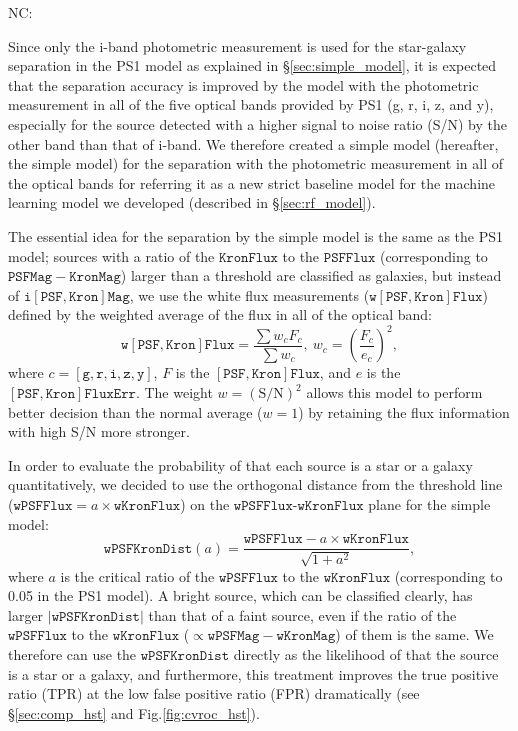 \documentclass[twocolumn]{aastex62}
\newcommand{\NC}[1]{{\color{brown} NC: {#1}}}
\begin{document}
\NC{
Since only the i-band photometric measurement is used for the star-galaxy separation  
in the PS1 model as explained in \S\ref{sec:simple_model},  
it is expected that the separation accuracy is improved 
by the model with the photometric measurement in all of the five optical bands 
provided by PS1 (g, r, i, z, and y), especially for the source 
detected with a higher signal to noise ratio (S/N) by the other band than that of i-band. 
We therefore created a simple model (hereafter, the simple model) for the separation 
with the photometric measurement in all of the optical bands 
for referring it as a new strict baseline model for the machine learning model  
we developed (described in \S\ref{sec:rf_model}).

The essential idea for the separation by the simple model is the same as the PS1 model;  
sources with a ratio of the $\mathtt{KronFlux}$ to the $\mathtt{PSFFlux}$ 
(corresponding to $\mathtt{PSFMag} - \mathtt{KronMag}$) larger than a threshold 
are classified as galaxies, 
but instead of $\mathtt{i[PSF, Kron]Mag}$,  
we use the white flux measurements ($\mathtt{w[PSF,Kron]Flux}$) 
defined by the weighted average of the flux in all of the optical band:   
$$
\mathtt{w[PSF, Kron]Flux} =  \frac{\sum w_c  F_c }{\sum w_c}, 
\ w_c = \left( \frac{F_c}{e_c} \right)^2, 
$$
where $c = [\mathtt{g, r, i, z, y}]$,  $F$ is the $\mathtt{[PSF,Kron]Flux}$, 
and $e$ is the $\mathtt{[PSF,Kron]FluxErr}$.  
The weight $w = \mathrm{(S/N)}^2$ allows this model to perform better decision 
than the normal average ($w = 1$) by retaining the flux information with high S/N more stronger. 

In order to evaluate the probability of that each source is a star or a galaxy quantitatively, 
we decided to use the orthogonal distance from the threshold line 
($\mathtt{wPSFFlux} = a\times \mathtt{wKronFlux}$) 
on the $\mathtt{wPSFFlux}$-$\mathtt{wKronFlux}$ plane for the simple model:  
$$
\mathtt{wPSFKronDist}(a) = 
	\frac{\mathtt{wPSFFlux} - a\times\mathtt{wKronFlux}}{ \sqrt{1 + a^2}}, 
$$
where $a$ is the critical ratio of the $\mathtt{wPSFFlux}$ to the $\mathtt{wKronFlux}$ 
(corresponding to 0.05 in the PS1 model). 
A bright source, which can be classified clearly, 
has larger $|\mathtt{wPSFKronDist}|$ than that of a faint source, 
even if the ratio of the $\mathtt{wPSFFlux}$ to the $\mathtt{wKronFlux} $
($\propto \mathtt{wPSFMag}  -  \mathtt{wKronMag}$) of them is the same. 
We therefore can use the $\mathtt{wPSFKronDist}$ directly 
as the likelihood of that the source is a star or a galaxy, 
and furthermore, this treatment improves the true positive ratio (TPR) 
at the low false positive ratio (FPR) dramatically (see \S\ref{sec:comp_hst} and Fig.\ref{fig:cvroc_hst}). 

}
\end{document}
